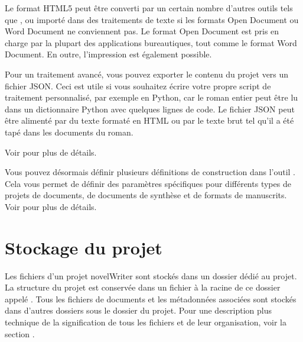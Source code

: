 \documentclass[a4paper,11pt,french]{sphinxmanual}
\begin{document}
\sphinxAtStartPar
Le format HTML5 peut être converti par un certain nombre d’autres outils tels que , ou importé dans des traitements de texte si les formats Open Document ou Word Document ne conviennent pas. Le format Open Document est pris en charge par la plupart des applications bureautiques, tout comme le format Word Document. En outre, l’impression est également possible.

\sphinxAtStartPar
Pour un traitement avancé, vous pouvez exporter le contenu du projet vers un fichier JSON. Ceci est utile si vous souhaitez écrire votre propre script de traitement personnalisé, par exemple en Python, car le roman entier peut être lu dans un dictionnaire Python avec quelques lignes de code. Le fichier JSON peut être alimenté par du texte formaté en HTML ou par le texte brut tel qu’il a été tapé dans les documents du roman.

\sphinxAtStartPar
Voir {\hyperref[\detokenize{project_manuscript:a-manuscript}]{}} pour plus de détails.

\sphinxAtStartPar
{}Vous pouvez désormais définir plusieurs définitions de construction dans l’outil . Cela vous permet de définir des paramètres spécifiques pour différents types de projets de documents, de documents de synthèse et de formats de manuscrits. Voir {\hyperref[\detokenize{project_manuscript:a-manuscript}]{}} pour plus de détails.


\section{Stockage du projet}
\label{\detokenize{usage_breakdown:project-storage}}\label{\detokenize{usage_breakdown:a-breakdown-storage}}
\sphinxAtStartPar
Les fichiers d’un projet novelWriter sont stockés dans un dossier dédié au projet. La structure du projet est conservée dans un fichier à la racine de ce dossier appelé . Tous les fichiers de documents et les métadonnées associées sont stockés dans d’autres dossiers sous le dossier du projet. Pour une description plus technique de la signification de tous les fichiers et de leur organisation, voir la section {\hyperref[\detokenize{tech_storage:a-storage}]{}}.
\end{document}
